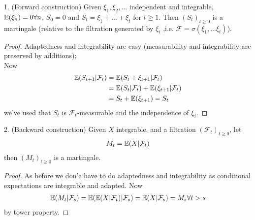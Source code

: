\documentclass[a4paper]{article}
\begin{document}
\begin{eg}
    1. (Forward construction) Given $\xi_1,\xi_2,...$ independent and integrable, $\mathbb{E}(\xi_n)=0 \forall n$, $S_0=0$ and $S_t = \xi_1+...+\xi_t$ for $t \geq 1$. Then $(S_t)_{t \geq 0}$ is a martingale (relative to the filtration generated by $\xi_i$ ,i.e. $\mathcal{F} =\sigma(\xi_1,...\xi_t)$).
    \begin{proof}
        Adaptedness and integrability are easy (measurability and integrability are preserved by additions);\\
        Now
        \begin{equation*}
            \begin{aligned}
                \mathbb{E}(S_{t+1}|\mathcal{F}_t) &= \mathbb{E}(S_t+\xi_{t+1} | \mathcal{F}_t)\\
                &= \mathbb{E}(S_t|\mathcal{F}_t) + \mathbb{E}(\xi_{t+1}|\mathcal{F}_t)\\
                &= S_t+\mathbb{E}(\xi_{t+1}) = S_t
            \end{aligned}
        \end{equation*}
        we've used that $S_t$ is $\mathcal{F}_t$-measurable and the independence of $\xi_i$.
    \end{proof}

    2. (Backward construction) Given $X$ integrable, and a filtration $(\mathcal{F}_t)_{t \geq 0}$, let
    \begin{equation*}
        \begin{aligned}
            M_t = \mathbb{E}(X|\mathcal{F}_t)
        \end{aligned}
    \end{equation*}
    then $(M_t)_{t \geq 0}$ is a martingale.
    \begin{proof}
        As before we don'e have to do adaptedness and integrability as conditional expectations are integrable and adapted. Now
        \begin{equation*}
            \begin{aligned}
                \mathbb{E}(M_t | \mathcal{F}_s) = \mathbb{E}(\mathbb{E}(X|\mathcal{F}_t)|\mathcal{F}_s) = \mathbb{E}(X|\mathcal{F}_s) = M_s \forall t>s
            \end{aligned}
        \end{equation*}
        by tower property.
    \end{proof}
\end{eg}
\end{document}
